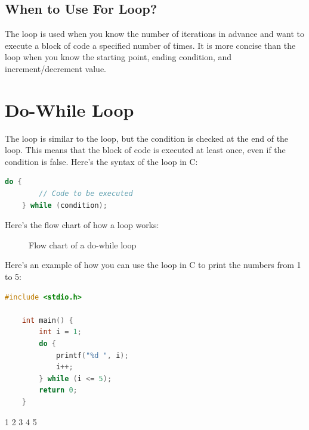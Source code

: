 \documentclass[12pt, openany]{book}
\begin{document}
\subsection{When to Use For Loop?}
The  loop is used when you know the number of iterations in advance and want to execute a block of code a specified number of times. It is more concise than the  loop when you know the starting point, ending condition, and increment/decrement value.

\clearpage
\section{Do-While Loop}
The  loop is similar to the  loop, but the condition is checked at the end of the loop. This means that the block of code is executed at least once, even if the condition is false. Here's the syntax of the  loop in C:
\begin{lstlisting}[language=C, gobble=0, caption=Do-While Loop Syntax]
    do {
        // Code to be executed
    } while (condition);
\end{lstlisting}

\noindent Here's the flow chart of how a  loop works:
\begin{figure}[h]
\centering
    \caption{Flow chart of a do-while loop}
    \vspace{2cm}
    \label{fig:dowhile_flowchart}
\end{figure}

\clearpage
\noindent Here's an example of how you can use the  loop in C to print the numbers from 1 to 5:
\begin{lstlisting}[language=C, gobble=0, caption=Using Do-While Loop in C]
    #include <stdio.h>
    
    int main() {
        int i = 1;
        do {
            printf("%d ", i);
            i++;
        } while (i <= 5);
        return 0;
    }
\end{lstlisting}
\begin{tcolorbox}[colback=lightgray!10, colframe=black, title=Output]
    1 2 3 4 5
\end{tcolorbox}
\end{document}
